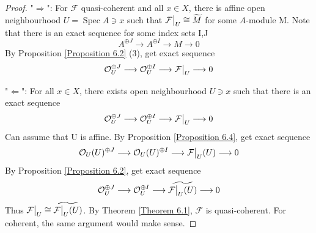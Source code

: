 \documentclass{ctexart}
\newcommand{\spec}{\operatorname{Spec}}
\begin{document}
\begin{proof}
    "$\Rightarrow$": For $\mathcal{F}$ quasi-coherent and all $x\in X$, 
    there is affine open neighbourhood $U = \spec A\ni x$ such that $\mathcal{F}\big{|}_{U} \cong \widetilde{M}$ for some $A$-module M.
    Note that there is an exact sequence for some index sets I,J
    \begin{equation*}
        A^{\oplus J} \longrightarrow A^{\oplus I} \longrightarrow M \longrightarrow 0
    \end{equation*}
    By Proposition \ref{Proposition 6.2} (3), get exact sequence
    \begin{equation*}
        \mathcal{O}_{U}^{\oplus J} \longrightarrow \mathcal{O}_{U}^{\oplus I} \longrightarrow \mathcal{F}\big{|}_{U} \longrightarrow 0
    \end{equation*}
    \par
    "$\Leftarrow$": For all $x\in X$, there exists open neighbourhood $U\ni x$ such that there is an exact sequence
    \begin{equation*}
        \mathcal{O}_{U}^{\oplus J} \longrightarrow \mathcal{O}_{U}^{\oplus I} \longrightarrow \mathcal{F}\big{|}_{U} \longrightarrow 0
    \end{equation*}
    Can assume that U is affine.
    By Proposition \ref{Proposition 6.4}, get exact sequence
    \begin{equation*}
        \mathcal{O}_{U}(U)^{\oplus J} \longrightarrow \mathcal{O}_{U}(U)^{\oplus I} \longrightarrow \mathcal{F}\big{|}_{U}(U) \longrightarrow 0
    \end{equation*}
    By Proposition \ref{Proposition 6.2}, get exact sequence
    \begin{equation*}
        \mathcal{O}_{U}^{\oplus J} \longrightarrow \mathcal{O}_{U}^{\oplus I} \longrightarrow \widetilde{\mathcal{F}\big{|}_{U}(U)} \longrightarrow 0
    \end{equation*}
    Thus $\mathcal{F}\big{|}_{U} \cong \widetilde{\mathcal{F}\big{|}_{U}(U)}$.
    By Theorem \ref{Theorem 6.1}, $\mathcal{F}$ is quasi-coherent.
    For coherent, the same argument would make sense.
\end{proof}
\end{document}
